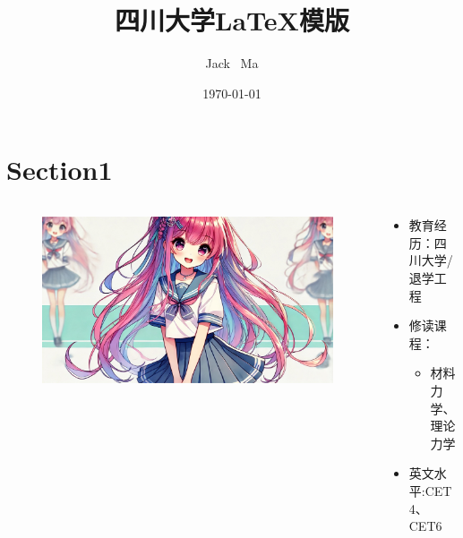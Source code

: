 \documentclass[aspectratio=1610]{beamer}
\title{四川大学LaTeX模版}
\author{Jack \ Ma}
\institute{四川大学 退学工程}
\date{\today}
\begin{document}
\titlepages%
\contentspage%
\section{Section1}
\begin{frame}
  \begin{minipage}[t][0.4\textheight][t]{\textwidth}
      \begin{columns}[t]
          \begin{column}{0.3\textwidth}
            \begin{figure}
              \includegraphics[width=\textwidth]{girl.jpg}
            \end{figure}
              
          \end{column}
          \begin{column}{0.7\textwidth}
             \begin{itemize}
              \item 教育经历：四川大学/退学工程
              \item 修读课程：\begin{itemize}
                              \item 材料力学、理论力学
                            \end{itemize}
              \item 英文水平:CET4、CET6           
             \end{itemize}
           
          \end{column}
      \end{columns}
  \end{minipage}
  \vspace{0.5cm}
\begin{minipage}[t][0.5\textheight][t]{\textwidth}
\end{minipage}
\end{frame}
\end{document}
